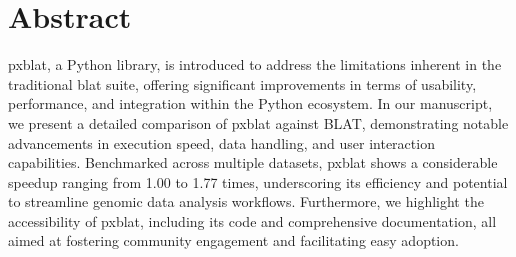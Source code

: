 \documentclass[10pt,letterpaper]{article}
\begin{document}
\section*{Abstract}
\gls{pxblat}, a Python library, is introduced to address the limitations inherent in the traditional \gls{blat} suite, offering significant improvements in terms of usability, performance, and integration within the Python ecosystem. In our manuscript, we present a detailed comparison of \gls{pxblat} against BLAT, demonstrating notable advancements in execution speed, data handling, and user interaction capabilities. Benchmarked across multiple datasets, \gls{pxblat} shows a considerable speedup ranging from 1.00 to 1.77 times, underscoring its efficiency and potential to streamline genomic data analysis workflows. Furthermore, we highlight the accessibility of \gls{pxblat}, including its code and comprehensive documentation, all aimed at fostering community engagement and facilitating easy adoption.


%

\end{document}
